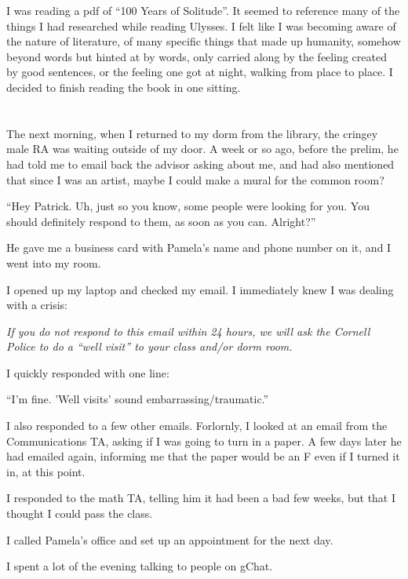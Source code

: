 I was reading a pdf of ``100 Years of Solitude''.  It seemed to reference many of the
things I had researched while reading Ulysses.  I felt like I was becoming aware
of the nature of literature, of many specific things that made up humanity,
somehow beyond words but hinted at by words, only carried along by the feeling
created by good sentences, or the feeling one got at night, walking from place
to place.  I decided to finish reading the book in one sitting.

\section{}

The next morning, when I returned to my dorm from the library, the cringey male
RA was waiting outside of my door.  A week or so ago, before the prelim, he had
told me to email back the advisor asking about me, and had also mentioned that
since I was an artist, maybe I could make a mural for the common room?

``Hey Patrick.  Uh, just so you know, some people were looking for you.  You
should definitely respond to them, as soon as you can.  Alright?''

He gave me a business card with Pamela's name and phone number on it, and I went
into my room.

I opened up my laptop and checked my email.  I immediately knew I was dealing
with a crisis: 

\textit{If you do not respond to this email within 24 hours, we will ask
the Cornell Police to do a ``well visit'' to your class and/or dorm room.}

I quickly responded with one line:

``I'm fine.  'Well visits' sound embarrassing/traumatic.'' 

I also responded to a few other emails.  Forlornly, I looked at an email from
the Communications TA, asking if I was going to turn in a paper.  A few days
later he had emailed again, informing me that the paper would be an F even if I
turned it in, at this point.  

I responded to the math TA, telling him it had been a bad few weeks, but that I
thought I could pass the class.

I called Pamela's office and set up an appointment for the next day. 

I spent a lot of the evening talking to people on gChat.  

\section{}

